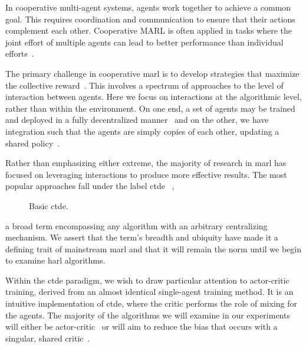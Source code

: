 In cooperative multi-agent systems, agents work together to achieve a 
common goal. This requires coordination and communication to ensure that 
their actions complement each other. Cooperative MARL is often applied 
in tasks where the joint effort of multiple agents can lead to better 
performance than individual efforts~\cite{littman1994}.

The primary challenge in cooperative \gls{marl} is to develop 
strategies that maximize the collective reward~\cite{albrecht2024}. 
This involves a spectrum of approaches to the level of interaction 
between agents. Here we focus on interactions at the algorithmic level, 
rather than within the environment. On one end, 
a set of agents may be trained and deployed in a fully decentralized
manner~\cite{li2023d} and on the other,
we have integration such that the agents are simply copies of each other,
updating a shared policy~\cite{zheng2017}.

Rather than emphasizing either extreme, the majority of research in \gls{marl} 
has focused on leveraging interactions to produce more effective results. 
The most popular approaches fall under the label \gls{ctde}~%
\cite{foerster2017,rashid2018,fotouhi2019,lowe2020,pan2021,%
papoudakis2021,li2023d,zhou2023}, 
%
\begin{wrapfigure}[9]{R}{0.4\textwidth}
    \vspace*{-2.5em}
    \centering
        
    \caption{Basic \gls{ctde}.}
    \label{fig:basic_ctde}
\end{wrapfigure}
%
a broad term encompassing any algorithm with an arbitrary centralizing 
mechanism. We assert that the term's breadth and ubiquity have made it 
a defining trait of mainstream \gls{marl} and that it will remain the 
norm until we begin to examine \gls{harl} algorithms.

Within the \gls{ctde} paradigm, we wish to draw particular attention to 
actor-critic training, derived from an almost identical single-agent 
training method. It is an intuitive implementation of \gls{ctde}, 
where the critic performs the role of mixing for the agents. 
The majority of the algorithms we will examine in our experiments 
will either be actor-critic~\cite{foerster2017,lowe2020,li2023c} 
or will aim to reduce the bias that occurs with a singular, 
shared critic~\cite{rashid2018,ackermann2019,li2023d,zhou2023}.






